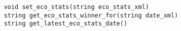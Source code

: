 \begin{verbatim}
    void set_eco_stats(string eco_stats_xml)
    string get_eco_stats_winner_for(string date_xml)
    string get_latest_eco_stats_date()
\end{verbatim}